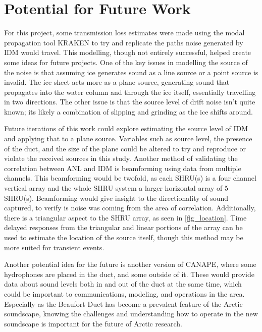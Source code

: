 \section{Potential for Future Work}


For this project, some transmission loss estimates were made using the modal propagation tool KRAKEN to try and replicate the paths noise generated by IDM would travel. This modelling, though not entirely successful, helped create some ideas for future projects. One of the key issues in modelling the source of the noise is that assuming ice generates sound as a line source or a point source is invalid. The ice sheet acts more as a plane source, generating sound that propagates into the water column and through the ice itself, essentially travelling in two directions. The other issue is that the source level of drift noise isn't quite known; its likely a combination of slipping and grinding as the ice shifts around.

Future iterations of this work could explore estimating the source level of IDM and applying that to a plane source. Variables such as source level, the presence of the duct, and the size of the plane could be altered to try and reproduce or violate the received sources in this study. Another method of validating the correlation between ANL and IDM is beamforming using data from multiple channels. This beamforming would be twofold, as each SHRU(s) is a four channel vertical array and the whole SHRU system a larger horizontal array of 5 SHRU(s). Beamforming would give insight to the directionality of sound captured, to verify is noise was coming from the area of correlation. Additionally, there is a triangular aspect to the SHRU array, as seen in \autoref{fig_location}. Time delayed responses from the triangular and linear portions of the array can be used to estimate the location of the source itself, though this method may be more suited for transient events.

Another potential idea for the future is another version of CANAPE, where some hydrophones are placed in the duct, and some outside of it. These would provide data about sound levels both in and out of the duct at the same time, which could be important to communications, modeling, and operations in the area. Especially as the Beaufort Duct has become a prevalent feature of the Arctic soundscape, knowing the challenges and understanding how to operate in the new soundscape is important for the future of Arctic research.



